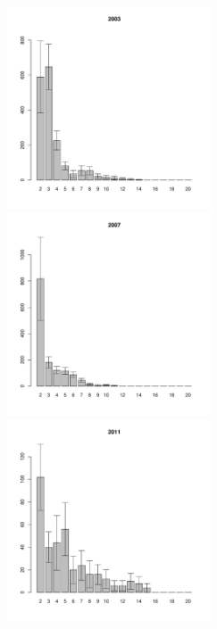 \begin{figure}[hp]
\begin{minipage}[b]{.3\linewidth}
\begin{center}
	\end{center}
	\end{minipage}
	\begin{minipage}[b]{.3\linewidth}
	\begin{center}
	\includegraphics[width=60mm]{../White_Sea/Ryashkov_YuG/YuG2_2003_.pdf}
	\end{center}
	\end{minipage}
	\hfill
	\begin{minipage}[b]{.3\linewidth}
	\begin{center}
	\includegraphics[width=60mm]{../White_Sea/Ryashkov_YuG/YuG2_2007_.pdf}
	\end{center}
	\end{minipage}
	\hfill
	\begin{minipage}[b]{.3\linewidth}
	\begin{center}
	\includegraphics[width=60mm]{../White_Sea/Ryashkov_YuG/YuG2_2011_.pdf}
	\end{center}
	\end{minipage}


\end{figure}
